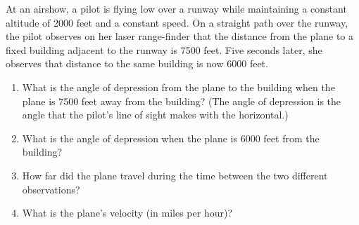 \documentclass{ximera}
\author{Elizabeth Campolongo}
\begin{document}
\begin{exercise}
At an airshow, a pilot is flying low over a runway while maintaining a constant altitude of 2000 feet and a constant speed.  On a straight path over the runway, the pilot observes on her laser range-finder that the distance from the plane to a fixed building adjacent to the runway is 7500 feet.  Five seconds later, she observes that distance to the same building is now 6000 feet.%
\par
%
\begin{enumerate}
\item What is the angle of depression from the plane to the building when the plane is 7500 feet away from the building? (The angle of depression is the angle that the pilot's line of sight makes with the horizontal.)
%
\item What is the angle of depression when the plane is 6000 feet from the building?
%
\item How far did the plane travel during the time between the two different observations?
%
\item What is the plane's velocity (in miles per hour)?
%
\end{enumerate}
\end{exercise}
\end{document}
